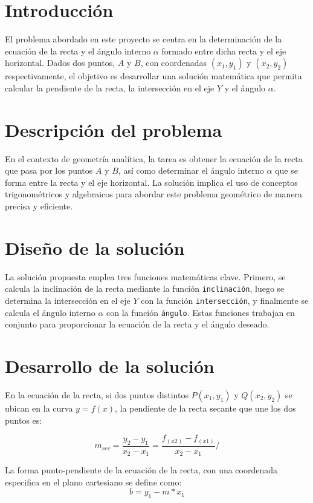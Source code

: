 \documentclass{IEEEcsmag}
\begin{document}
\section{Introducción}
El problema abordado en este proyecto se centra en la determinación de la ecuación de la recta y el ángulo interno $\alpha$ 
formado entre dicha recta y el eje horizontal. Dados dos puntos, $A$ y $B$, con coordenadas $(x_1, y_1)$ y $(x_2, y_2)$ respectivamente, 
el objetivo es desarrollar una solución matemática que permita calcular la pendiente de la recta, la intersección en el eje $Y$ y el ángulo $\alpha$.

\section{Descripción del problema}
En el contexto de geometría analítica, la tarea es obtener la ecuación de la recta que pasa por los puntos $A$ y $B$, 
así como determinar el ángulo interno $\alpha$ que se forma entre la recta y el eje horizontal. 
La solución implica el uso de conceptos trigonométricos y algebraicos para abordar este problema geométrico de manera precisa y eficiente.

\section{Diseño de la solución}
La solución propuesta emplea tres funciones matemáticas clave. Primero, se calcula la inclinación de la recta mediante la función \texttt{inclinación}, 
luego se determina la intersección en el eje $Y$ con la función \texttt{intersección}, y finalmente se calcula el ángulo interno $\alpha$ con la función \texttt{ángulo}. 
Estas funciones trabajan en conjunto para proporcionar la ecuación de la recta y el ángulo deseado.

\section{Desarrollo de la solución}
En la ecuación de la recta, si dos puntos distintos $P(x_{1}, y_{1})$ y $Q(x_{2}, y_{2})$ se ubican en la curva $y=f(x)$, 
la pendiente de la recta secante que une los dos puntos es:

\begin{equation}
    m_{sec}=\frac{y_{2} - y_{1}}{x_{2} - x_{1}} = \frac{f_{(x2)} - f_{(x1)} }{x_{2} - x_{1}}/
    \label{eqn:rectaPendiente}
\end{equation}

La forma punto-pendiente de la ecuación de la recta, con una coordenada especifica en el plano cartesiano se define como:
\begin{equation}
    b = y_{1} - m * x_{1}
\end{equation}
\end{document}
